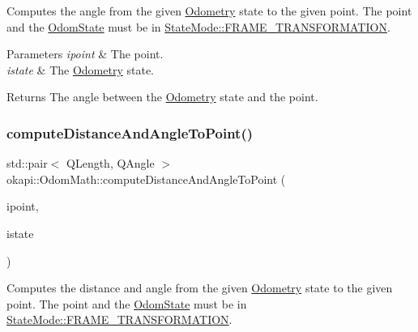 Computes the angle from the given \mbox{\hyperlink{classokapi_1_1Odometry}{Odometry}} state to the given point. The point and the \mbox{\hyperlink{structokapi_1_1OdomState}{Odom\+State}} must be in {\ttfamily \mbox{\hyperlink{namespaceokapi_af37fbd761bd859a00ff4dd4a87dd8c07ad5ed7666e5cebf60d3af20a5a46edf3b}{State\+Mode\+::\+F\+R\+A\+M\+E\+\_\+\+T\+R\+A\+N\+S\+F\+O\+R\+M\+A\+T\+I\+ON}}}.


\begin{DoxyParams}{Parameters}
{\em ipoint} & The point. \\
\hline
{\em istate} & The \mbox{\hyperlink{classokapi_1_1Odometry}{Odometry}} state. \\
\hline
\end{DoxyParams}
\begin{DoxyReturn}{Returns}
The angle between the \mbox{\hyperlink{classokapi_1_1Odometry}{Odometry}} state and the point. 
\end{DoxyReturn}
\mbox{\label{classokapi_1_1OdomMath_a97865973f203ed07eb8f642fea344c23}} 
\subsubsection{\texorpdfstring{computeDistanceAndAngleToPoint()}{computeDistanceAndAngleToPoint()}}
{\footnotesize\ttfamily std\+::pair$<$ Q\+Length, Q\+Angle $>$ okapi\+::\+Odom\+Math\+::compute\+Distance\+And\+Angle\+To\+Point (\begin{DoxyParamCaption}\item[{const \mbox{\hyperlink{structokapi_1_1Point}{Point}} \&}]{ipoint,  }\item[{const \mbox{\hyperlink{structokapi_1_1OdomState}{Odom\+State}} \&}]{istate }\end{DoxyParamCaption})\hspace{0.3cm}{\ttfamily [static]}}

Computes the distance and angle from the given \mbox{\hyperlink{classokapi_1_1Odometry}{Odometry}} state to the given point. The point and the \mbox{\hyperlink{structokapi_1_1OdomState}{Odom\+State}} must be in {\ttfamily \mbox{\hyperlink{namespaceokapi_af37fbd761bd859a00ff4dd4a87dd8c07ad5ed7666e5cebf60d3af20a5a46edf3b}{State\+Mode\+::\+F\+R\+A\+M\+E\+\_\+\+T\+R\+A\+N\+S\+F\+O\+R\+M\+A\+T\+I\+ON}}}.


